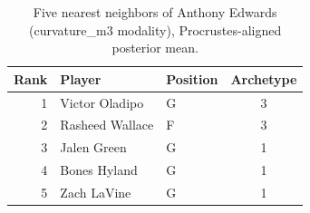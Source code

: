 \begin{table}[htbp]
  \centering\small
  \begin{tabular}{rllc}
    \toprule
    Rank & Player & Position & Archetype \\
    \midrule
    1 & Victor Oladipo & G & 3 \\
    2 & Rasheed Wallace & F & 3 \\
    3 & Jalen Green & G & 1 \\
    4 & Bones Hyland & G & 1 \\
    5 & Zach LaVine & G & 1 \\
    \bottomrule
  \end{tabular}
  \caption{Five nearest neighbors of Anthony Edwards (curvature_m3 modality), Procrustes-aligned posterior mean.}
  \label{tab:Anthony_Edwards_neighbors_curvature_m3}
\end{table}

